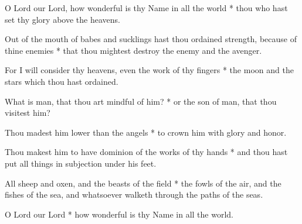 O Lord our Lord, how wonderful is thy Name in all the world * thou who hast set thy glory above the heavens.

Out of the mouth of babes and sucklings hast thou ordained strength, because of thine enemies * that thou mightest destroy the enemy and the avenger.

For I will consider thy heavens, even the work of thy fingers * the moon and the stars which thou hast ordained.

What is man, that thou art mindful of him? * or the son of man, that thou visitest him?

Thou madest him lower than the angels * to crown him with glory and honor.

Thou makest him to have dominion of the works of thy hands * and thou hast put all things in subjection under his feet.

All sheep and oxen, and the beasts of the field * the fowls of the air, and the fishes of the sea, and whatsoever walketh through the paths of the seas.

O Lord our Lord * how wonderful is thy Name in all the world.